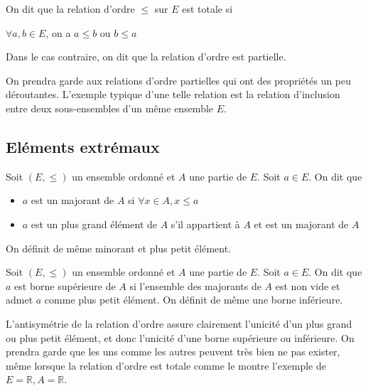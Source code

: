 \begin{de}
On dit que la relation d'ordre $\leqslant$ sur $E$ est totale si

$\forall a,b \in E$, on a $a \leqslant b$ ou $b \leqslant a$

Dans le cas contraire, on dit que la relation d'ordre est partielle.
\end{de}

\begin{rem}
On prendra garde aux relations d'ordre partielles qui ont
des propriétés un peu déroutantes. L'exemple typique d'une telle
relation est la relation d'inclusion entre deux sous-ensembles d'un même
ensemble $E$.
\end{rem}

\subsection{Eléments extrémaux}

\begin{de}
Soit $(E,\leqslant)$ un ensemble ordonné et $A$ une partie de $E$.
Soit $a \in E$. On dit que

\begin{itemize}
\itemsep1pt\parskip0pt
\item
  $a$ est un majorant de $A$ si $\forall x \in A, x \leqslant a$
\item
  $a$ est un plus grand élément de $A$ s'il appartient à $A$ et est un
  majorant de $A$
\end{itemize}

On définit de même minorant et plus petit élément.
\end{de}

\begin{de}
Soit $(E,\leqslant)$ un ensemble ordonné et $A$ une partie de $E$.
Soit $a \in E$. On dit que $a$ est borne supérieure de $A$ si l'ensemble des
majorants de $A$ est non vide et admet $a$ comme plus petit élément. On
définit de même une borne inférieure.
\end{de}

\begin{rem}
L'antisymétrie de la relation d'ordre assure clairement
l'unicité d'un plus grand ou plus petit élément, et donc l'unicité d'une
borne supérieure ou inférieure. On prendra garde que les uns comme les
autres peuvent très bien ne pas exister, même lorsque la relation
d'ordre est totale comme le montre l'exemple de $E = \mathbb{R}, A = \mathbb{R}$.
\end{rem}

